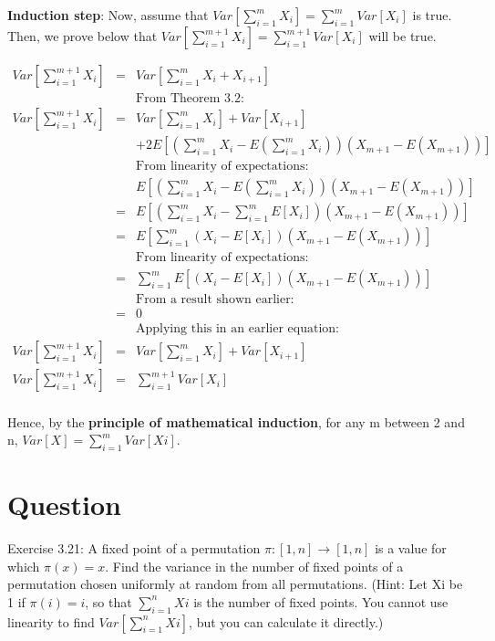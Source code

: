 \documentclass[10pt]{article}
\begin{document}
\textbf{Induction step}: Now, assume that $Var[\sum_{i=1}^{m}X_{i}] = \sum_{i=1}^{m}Var[X_{i}]$ is true. Then, we prove below that $Var[\sum_{i=1}^{m+1}X_{i}] = \sum_{i=1}^{m+1}Var[X_{i}]$ will be true.

\begin{eqnarray}
Var[\sum_{i=1}^{m+1}X_{i}] &=& Var[\sum_{i=1}^{m}X_{i}+X_{i+1}]\\ 
&&\text{From Theorem 3.2:}\\
Var[\sum_{i=1}^{m+1}X_{i}] &=& Var[\sum_{i=1}^{m}X_{i}]+Var[X_{i+1}]\\
&&+2E[(\sum_{i=1}^{m}X_{i}-E(\sum_{i=1}^{m}X_{i}))(X_{m+1}-E(X_{m+1}))]\\ 
&&\text{From linearity of expectations:}\\
&&E[(\sum_{i=1}^{m}X_{i}-E(\sum_{i=1}^{m}X_{i}))(X_{m+1}-E(X_{m+1}))]\\
&=& E[(\sum_{i=1}^{m}X_{i}-\sum_{i=1}^{m}E[X_{i}])(X_{m+1}-E(X_{m+1}))]\\
&=& E[\sum_{i=1}^{m}(X_{i}-E[X_{i}])(X_{m+1}-E(X_{m+1}))]\\
&&\text{From linearity of expectations:}\\
&=& \sum_{i=1}^{m}E[(X_{i}-E[X_{i}])(X_{m+1}-E(X_{m+1}))]\\
&&\text{From a result shown earlier:}\\
&=& 0\\
&&\text{Applying this in an earlier equation:}\\
Var[\sum_{i=1}^{m+1}X_{i}] &=& Var[\sum_{i=1}^{m}X_{i}]+Var[X_{i+1}]\\
Var[\sum_{i=1}^{m+1}X_{i}] &=& \sum_{i=1}^{m+1}Var[X_{i}]\\
\end{eqnarray}

Hence, by the \textbf{principle of mathematical induction}, for any m between 2 and n, $Var[X] = \sum_{i=1}^{m}Var[Xi]$.

\section{Question}

Exercise 3.21: A fixed point of a permutation $\pi: [1, n]\rightarrow[1, n]$ is a value for which $\pi(x)=x$. Find the variance in the number of fixed points of a permutation chosen uniformly at random from all permutations. (Hint: Let Xi be 1 if $\pi(i)=i$, so that $\sum_{i=1}^{n}Xi$ is the number of fixed points. You cannot use linearity to find $Var[\sum_{i=1}^{n}Xi]$, but you can calculate it directly.)
\end{document}
